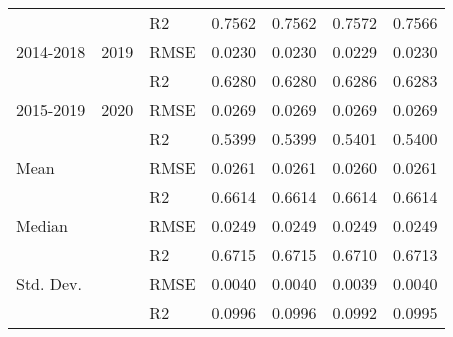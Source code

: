 \begin{tabular}{lllrrrr}
           &       &      R2 &  0.7562 &  0.7562 &  0.7572 &       0.7566 \\
 2014-2018 &  2019 &    RMSE &  0.0230 &  0.0230 &  0.0229 &       0.0230 \\
           &       &      R2 &  0.6280 &  0.6280 &  0.6286 &       0.6283 \\
 2015-2019 &  2020 &    RMSE &  0.0269 &  0.0269 &  0.0269 &       0.0269 \\
           &       &      R2 &  0.5399 &  0.5399 &  0.5401 &       0.5400 \\
      Mean &       &    RMSE &  0.0261 &  0.0261 &  0.0260 &       0.0261 \\
           &       &      R2 &  0.6614 &  0.6614 &  0.6614 &       0.6614 \\
    Median &       &    RMSE &  0.0249 &  0.0249 &  0.0249 &       0.0249 \\
           &       &      R2 &  0.6715 &  0.6715 &  0.6710 &       0.6713 \\
 Std. Dev. &       &    RMSE &  0.0040 &  0.0040 &  0.0039 &       0.0040 \\
           &       &      R2 &  0.0996 &  0.0996 &  0.0992 &       0.0995 \\
\bottomrule
\end{tabular}
